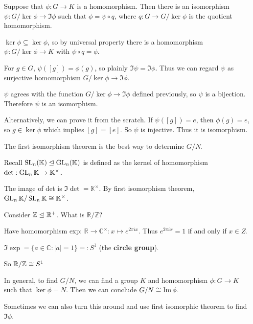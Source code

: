 \begin{thm}
Suppose that $\phi:G\to K$ is a homomorphism. Then there is an isomorphism $\psi:G/\ker\phi\to \Im\phi$ such that $\phi =\psi\circ q$, where $q:G\to G/\ker\phi$ is the quotient homomorphism.
\end{thm}

\begin{pf}
$\ker \phi\subseteq \ker\phi$, so by universal property there is a homomorphism $\psi: G/\ker\phi\to K$ with $\psi\circ q=\phi$.

For $g\in G$, $\psi([g])=\phi(g)$, so plainly $\Im \psi= \Im\phi$. Thus we can regard $\psi$ as surjective homomorphism $G/\ker\phi\to \Im\phi$.

$\psi$ agrees with the function $G/\ker \phi\to \Im\phi$ defined previously, so $\psi$ is a bijection. Therefore $\psi$ is an isomorphism.

Alternatively, we can prove it from the scratch. If $\psi([g])=e$, then $\phi(g)=e$, so $g\in \ker\phi$ which implies $[g]=[e]$. So $\psi$ is injective. Thus it is isomorphism.
\end{pf}
The first isomorphism theorem is the best way to determine $G/N$.
\begin{ex}
Recall $\operatorname{SL}_n (\mathbb{K})\trianglelefteq \operatorname{GL}_n (\mathbb{K})$ is defined as the kernel of homomorphism $\det:\operatorname{GL}_n \mathbb{K}\to \mathbb{K}^\times$.

The image of det is $\Im\det=\mathbb{K}^\times$.
By first isomorphism theorem, $\operatorname{GL}_n \mathbb{K}/\operatorname{SL}_n \mathbb{K}\cong \mathbb{K}^\times$.
\end{ex}

\begin{ex}
Consider $\mathbb{Z}\trianglelefteq \mathbb{R}^+$. What is $\mathbb{R}/\mathbb{Z}$?

Have homomorphism exp: $\mathbb{R}\to \mathbb{C}^\times: x\mapsto e^{2\pi ix}$. Thus $e^{2\pi ix}=1$ if and only if $x\in Z$.

$\Im \exp = \{a\in \mathbb{C}:|a|=1\}=:S^1$ (the \textbf{circle group}).

So $\mathbb{R}/\mathbb{Z}\cong S^1$
\end{ex}

In general, to find $G/N$, we can find a group $K$ and homomorphism $\phi:G\to K$ such that $\ker\phi=N$. Then we can conclude $G/N\cong \operatorname{Im}\phi$. 

Sometimes we can also turn this around and use first isomorphic theorem to find $\Im\phi$.

